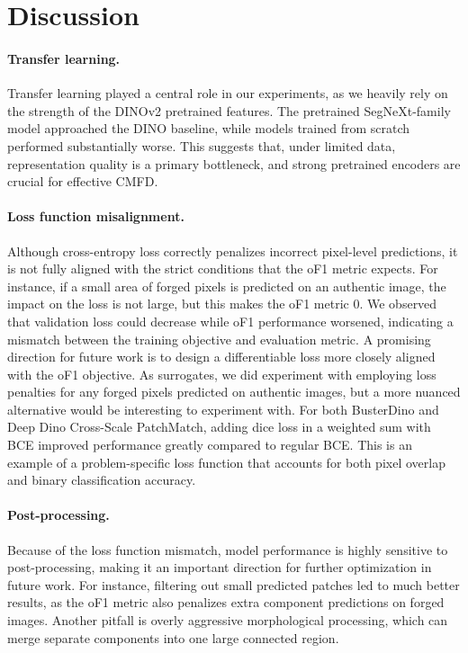 \documentclass[final]{nldl}
\begin{document}
\section{Discussion}

\paragraph{Transfer learning.} Transfer learning played a central role in our experiments, as we heavily rely on the strength of the DINOv2 pretrained features. The pretrained SegNeXt-family model approached the DINO baseline, while models trained from scratch performed substantially worse. This suggests that, under limited data, representation quality is a primary bottleneck, and strong pretrained encoders are crucial for effective CMFD. 
\paragraph{Loss function misalignment.} Although cross-entropy loss correctly penalizes incorrect pixel-level predictions, it is not fully aligned with the strict conditions that the oF1 metric expects. For instance, if a small area of forged pixels is predicted on an authentic image, the impact on the loss is not large, but this makes the oF1 metric $0$. We observed that validation loss could decrease while oF1 performance worsened, indicating a mismatch between the training objective and evaluation metric. A promising direction for future work is to design a differentiable loss more closely aligned with the oF1 objective. As surrogates, we did experiment with employing loss penalties for any forged pixels predicted on authentic images, but a more nuanced alternative would be interesting to experiment with. For both BusterDino and Deep Dino Cross-Scale PatchMatch, adding dice loss in a weighted sum with BCE improved performance greatly compared to regular BCE. This is an example of a problem-specific loss function that accounts for both pixel overlap and binary classification accuracy.
\paragraph{Post-processing.}Because of the loss function mismatch, model performance is highly sensitive to post-processing, making it an important direction for further optimization in future work. For instance, filtering out small predicted patches led to much better results, as the oF1 metric also penalizes extra component predictions on forged images. Another pitfall is overly aggressive morphological processing, which can merge separate components into one large connected region.
\end{document}
